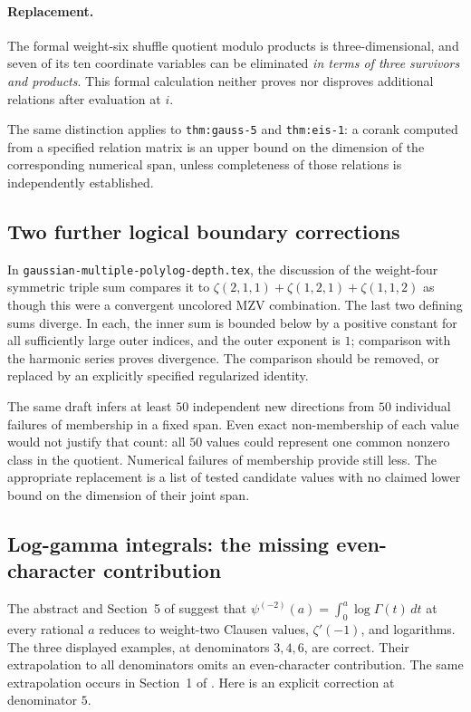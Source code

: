 \documentclass[11pt,a4paper]{article}
\theoremstyle{definition}
\theoremstyle{remark}
\numberwithin{equation}{section}
\begin{document}
\paragraph{Replacement.}
The formal weight-six shuffle quotient modulo products is
three-dimensional, and seven of its ten coordinate variables can be
eliminated \emph{in terms of three survivors and products}.
This formal calculation neither proves nor disproves additional
relations after evaluation at $i$.

The same distinction applies to \texttt{thm:gauss-5} and
\texttt{thm:eis-1}: a corank computed from a specified relation matrix is
an upper bound on the dimension of the corresponding numerical span,
unless completeness of those relations is independently established.

\subsection{Two further logical boundary corrections}
\label{audit:poly:other}

In \texttt{gaussian-multiple-polylog-depth.tex}, the discussion of the
weight-four symmetric triple sum compares it to
$\zeta(2,1,1)+\zeta(1,2,1)+\zeta(1,1,2)$ as though this were a convergent
uncolored MZV combination. The last two defining sums diverge. In each,
the inner sum is bounded below by a positive constant for all sufficiently
large outer indices, and the outer exponent is $1$; comparison with the
harmonic series proves divergence. The comparison should be removed,
or replaced by an explicitly specified regularized identity.

The same draft infers at least $50$ independent new directions from
$50$ individual failures of membership in a fixed span. Even exact
non-membership of each value would not justify that count: all $50$
values could represent one common nonzero class in the quotient.
Numerical failures of membership provide still less. The appropriate
replacement is a list of tested candidate values with no claimed lower
bound on the dimension of their joint span.

\subsection{Log-gamma integrals: the missing even-character contribution}
\label{corr:loggamma}

The abstract and Section~5 of
 suggest that
$\psi^{(-2)}(a)=\int_0^a\log\Gamma(t)\,dt$ at every rational $a$ reduces
to weight-two Clausen values, $\zeta'(-1)$, and logarithms.  The three
displayed examples, at denominators $3,4,6$, are correct.  Their
extrapolation to all denominators omits an even-character contribution.
The same extrapolation occurs in Section~1 of
.
Here is an explicit correction at denominator $5$.
\end{document}
